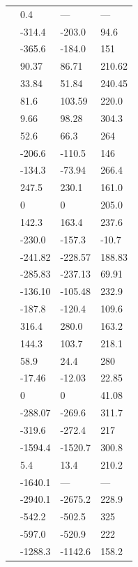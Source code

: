 \begin{supertabular}{llll}
     & 0.4 & --- & --- \\
     & -314.4 & -203.0 & 94.6 \\
     & -365.6 & -184.0 & 151 \\
     & 90.37 & 86.71 & 210.62 \\
     & 33.84 & 51.84 & 240.45 \\
     & 81.6 & 103.59 & 220.0 \\
     & 9.66 & 98.28 & 304.3 \\
     & 52.6 & 66.3 & 264 \\
     & -206.6 & -110.5 & 146 \\
     & -134.3 & -73.94 & 266.4 \\
     & 247.5 & 230.1 & 161.0 \\
     & 0 & 0 & 205.0 \\
     & 142.3 & 163.4 & 237.6 \\
     & -230.0 & -157.3 & -10.7 \\
     & -241.82 & -228.57 & 188.83 \\
     & -285.83 & -237.13 & 69.91 \\
     & -136.10 & -105.48 & 232.9 \\
     & -187.8 & -120.4 & 109.6 \\
     & 316.4 & 280.0 & 163.2 \\
     & 144.3 & 103.7 & 218.1 \\
     & 58.9 & 24.4 & 280 \\
     & -17.46 & -12.03 & 22.85 \\
     & 0 & 0 & 41.08 \\
     & -288.07 & -269.6 & 311.7 \\
     & -319.6 & -272.4 & 217 \\
     & -1594.4 & -1520.7 & 300.8 \\
     & 5.4 & 13.4 & 210.2 \\
     & -1640.1 & --- & --- \\
     & -2940.1 & -2675.2 & 228.9 \\
     & -542.2 & -502.5 & 325 \\
     & -597.0 & -520.9 & 222 \\
     & -1288.3 & -1142.6 & 158.2 \\

\end{supertabular}
